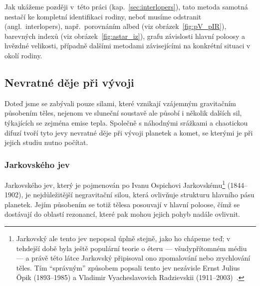 \documentclass[A4paper, 12pt, oneside]{book}
\begin{document}
Jak ukážeme později v~této práci (kap.~\ref{sec:interlopers}), tato metoda samotná nestačí ke kompletní identifikaci rodiny, neboť musíme odstranit  (angl.\ interlopers), např.\ porovnáním albed (viz obrázek~\ref{fig:pV_pIR}), barevných indexů (viz obrázek~\ref{fig:astar_iz}), grafu závislosti hlavní poloosy a hvězdné velikosti, případně dalšími metodami závisejícími na konkrétní situaci v okolí rodiny.

\subsection{Nevratné děje při vývoji}

Doteď jsme se zabývali pouze silami, které vznikají vzájemným gravitačním působením těles, nejenom ve sluneční soustavě ale působí i několik dalších sil, týkajících se zejména emise tepla. Společně s náhodnými srážkami a chaotickou difuzí tvoří tyto jevy nevratné děje při vývoji planetek a komet, se kterými je při jejich studiu nutno počítat.

\subsubsection{Jarkovského jev} \label{sec:jarko}
Jarkovského jev, který je pojmenován po Ivanu Ospichovi Jarkovskému\footnote{Jarkovský ale tento jev nepopsal úplně stejně, jako ho chápeme teď; v tehdejší době byla ještě populární teorie o éteru --- všudypřítomném médiu --- a právě této látce Jarkovský připisoval ono zpomalování nebo zrychlování těles. Tím \enquote{správným} způsobem popsali tento jev nezávisle Ernst Julius Öpik (1893--1985) a Vladimir Vyacheslavovich Radzievskii (1911--2003)~\cite{brozphd}.}  (1844--1902), je nejdůležitější negravitační silou, která ovlivňuje strukturu hlavního pásu planetek. Jejím působením se totiž tělesa posouvají v hlavní poloose, čímž se dostávají do oblastí rezonancí, které pak mohou jejich pohyb nadále ovlivnit.
\end{document}
